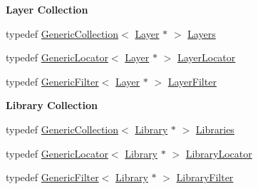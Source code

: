 \begin{Indent}\textbf{ Layer Collection}\par
\begin{DoxyCompactItemize}
\item 
typedef \mbox{\hyperlink{classHurricane_1_1GenericCollection}{Generic\+Collection}}$<$ \mbox{\hyperlink{classHurricane_1_1Layer}{Layer}} $\ast$ $>$ \mbox{\hyperlink{namespaceHurricane_a7b7200a36ab7ce8a157ddbe78b625f38}{Layers}}
\item 
typedef \mbox{\hyperlink{classHurricane_1_1GenericLocator}{Generic\+Locator}}$<$ \mbox{\hyperlink{classHurricane_1_1Layer}{Layer}} $\ast$ $>$ \mbox{\hyperlink{namespaceHurricane_a91a93ea29be3e6658d72f9bee0da8c7b}{Layer\+Locator}}
\item 
typedef \mbox{\hyperlink{classHurricane_1_1GenericFilter}{Generic\+Filter}}$<$ \mbox{\hyperlink{classHurricane_1_1Layer}{Layer}} $\ast$ $>$ \mbox{\hyperlink{namespaceHurricane_a150e0e72c5c5609e0feb3311fa5bc127}{Layer\+Filter}}
\end{DoxyCompactItemize}
\end{Indent}
\begin{Indent}\textbf{ Library Collection}\par
\begin{DoxyCompactItemize}
\item 
typedef \mbox{\hyperlink{classHurricane_1_1GenericCollection}{Generic\+Collection}}$<$ \mbox{\hyperlink{classHurricane_1_1Library}{Library}} $\ast$ $>$ \mbox{\hyperlink{namespaceHurricane_a2868a53bbb0507710460ff02fab77cad}{Libraries}}
\item 
typedef \mbox{\hyperlink{classHurricane_1_1GenericLocator}{Generic\+Locator}}$<$ \mbox{\hyperlink{classHurricane_1_1Library}{Library}} $\ast$ $>$ \mbox{\hyperlink{namespaceHurricane_a0477ab8ee799bb25ce9521ac16dbb6b9}{Library\+Locator}}
\item 
typedef \mbox{\hyperlink{classHurricane_1_1GenericFilter}{Generic\+Filter}}$<$ \mbox{\hyperlink{classHurricane_1_1Library}{Library}} $\ast$ $>$ \mbox{\hyperlink{namespaceHurricane_a72d63f6bfd54feac2663e60430fd443d}{Library\+Filter}}
\end{DoxyCompactItemize}
\end{Indent}
